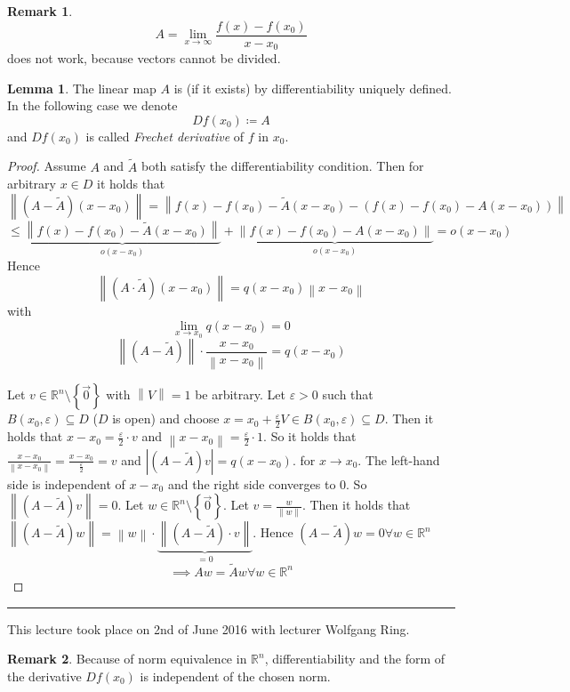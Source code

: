 \documentclass[a4paper,landscape,twocolumn]{article}
\theoremstyle{definition}
\newtheorem{rem}{Remark}
\newtheorem{lemma}{Lemma}
\newcommand\set[1]{\left\{#1\right\}}
\newcommand\abs[1]{\left|#1\right|}
\newcommand\meta[3]{\hrule{} This #1 took place on #2 with lecturer #3.\par}
\newcommand\norm[1]{\left\|#1\right\|}
\begin{document}
\begin{rem}
  \[ A = \lim_{x\to\infty} \frac{f(x) - f(x_0)}{x - x_0} \]
  does not work, because vectors cannot be divided.
\end{rem}
\begin{lemma}
  The linear map $A$ is (if it exists) by differentiability uniquely defined.
  In the following case we denote
  \[ Df(x_0) \coloneqq A \]
  and $Df(x_0)$ is called \emph{Frechet derivative} of $f$ in $x_0$.
\end{lemma}
\begin{proof}
  Assume $A$ and $\tilde{A}$ both satisfy the differentiability condition.
  Then for arbitrary $x \in D$ it holds that
  \[
    \norm{(A - \tilde{A}) (x - x_0)} =
    \norm{f(x) - f(x_0) - \tilde{A}(x - x_0) - \left(f(x) - f(x_0) - A(x - x_0)\right)}
  \] \[
    \leq \underbrace{\norm{f(x) - f(x_0) - \tilde{A}(x - x_0)}}_{o(x - x_0)} + \underbrace{\norm{f(x) - f(x_0) - A(x - x_0)}}_{o(x - x_0)} = o(x - x_0)
  \]
  Hence
  \[ \norm{(A \cdot \tilde{A})(x - x_0)} = q (x - x_0) \norm{x - x_0} \]
  with
  \[ \lim_{x \to x_0} q(x - x_0) = 0 \]
  \[ \norm{(A - \tilde{A})} \cdot \frac{x - x_0}{\norm{x - x_0}} = q (x - x_0) \]

  Let $v \in \mathbb R^n \setminus \set{\vec{0}}$ with $\norm{V} = 1$ be arbitrary.
  Let $\varepsilon > 0$ such that $B(x_0, \varepsilon) \subseteq D$ ($D$ is open)
  and choose $x = x_0 + \frac{\varepsilon}{2} V \in B(x_0, \varepsilon) \subseteq D$.
  Then it holds that $x - x_0 = \frac{\varepsilon}{2} \cdot v$ and $\norm{x - x_0} = \frac{\varepsilon}{2} \cdot 1$.
  So it holds that $\frac{x - x_0}{\norm{x - x_0}} = \frac{x - x_0}{\frac{\varepsilon}{2}} = v$ and $\abs{(A - \tilde{A}) v} = q(x - x_0)$.
  for $x \to x_0$. The left-hand side is independent of $x - x_0$ and the right side converges to $0$. So $\norm{(A - \tilde{A}) v} = 0$.
  Let $w \in \mathbb R^n \setminus \set{\vec{0}}$. Let $v = \frac{w}{\norm{w}}$.
  Then it holds that $\norm{(A - \tilde{A}) w} = \norm{w} \cdot \underbrace{\norm{(A - \tilde{A}) \cdot v}}_{=0}$.
  Hence $(A - \tilde{A}) w = 0 \forall w \in \mathbb R^n$
  \[ \implies Aw = \tilde A w \forall w \in \mathbb R^n \]
\end{proof}

\meta{lecture}{2nd of June 2016}{Wolfgang Ring}

\begin{rem}
  Because of norm equivalence in $\mathbb R^n$, differentiability and the form of the derivative $Df(x_0)$ is independent of the chosen norm.
\end{rem}
\end{document}
